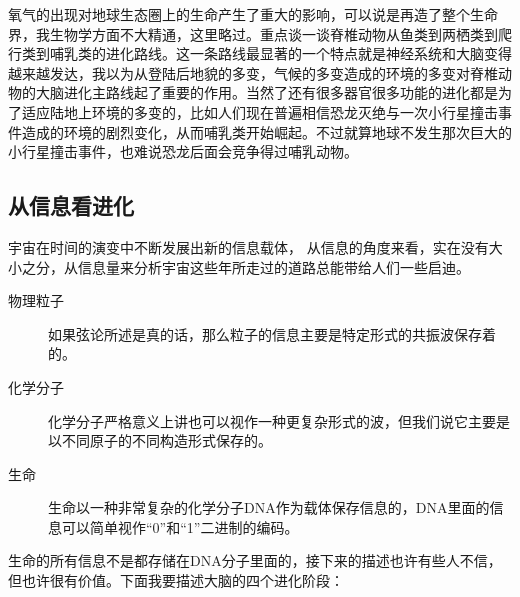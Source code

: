 \documentclass[11pt,oneside]{article}
\begin{document}
氧气的出现对地球生态圈上的生命产生了重大的影响，可以说是再造了整个生命界，我生物学方面不大精通，这里略过。重点谈一谈脊椎动物从鱼类到两栖类到爬行类到哺乳类的进化路线。这一条路线最显著的一个特点就是神经系统和大脑变得越来越发达，我以为从登陆后地貌的多变，气候的多变造成的环境的多变对脊椎动物的大脑进化主路线起了重要的作用。当然了还有很多器官很多功能的进化都是为了适应陆地上环境的多变的，比如人们现在普遍相信恐龙灭绝与一次小行星撞击事件造成的环境的剧烈变化，从而哺乳类开始崛起。不过就算地球不发生那次巨大的小行星撞击事件，也难说恐龙后面会竞争得过哺乳动物。


\subsection{从信息看进化}
\label{sec-6-2}
宇宙在时间的演变中不断发展出新的信息载体， 从信息的角度来看，实在没有大小之分，从信息量来分析宇宙这些年所走过的道路总能带给人们一些启迪。

\begin{description}
\item[{物理粒子}] 如果弦论所述是真的话，那么粒子的信息主要是特定形式的共振波保存着的。
\item[{化学分子}] 化学分子严格意义上讲也可以视作一种更复杂形式的波，但我们说它主要是以不同原子的不同构造形式保存的。
\item[{生命}] 生命以一种非常复杂的化学分子DNA作为载体保存信息的，DNA里面的信息可以简单视作“0”和“1”二进制的编码。
\end{description}


生命的所有信息不是都存储在DNA分子里面的，接下来的描述也许有些人不信，但也许很有价值。下面我要描述大脑的四个进化阶段：
\end{document}
